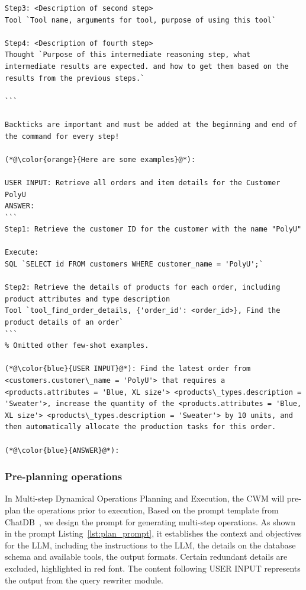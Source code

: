 \documentclass[preprint,12pt]{elsarticle}
\begin{document}
\begin{lstlisting}[style=prompt, label={lst:plan_prompt},caption={Prompt for generating the planned multi-step Operations},aboveskip=0pt, belowskip=0pt]
Step3: <Description of second step>
Tool `Tool name, arguments for tool, purpose of using this tool`

Step4: <Description of fourth step>
Thought `Purpose of this intermediate reasoning step, what intermediate results are expected. and how to get them based on the results from the previous steps.`

```

Backticks are important and must be added at the beginning and end of the command for every step!

(*@\color{orange}{Here are some examples}@*):

USER INPUT: Retrieve all orders and item details for the Customer PolyU
ANSWER:
```
Step1: Retrieve the customer ID for the customer with the name "PolyU"

Execute:
SQL `SELECT id FROM customers WHERE customer_name = 'PolyU';`

Step2: Retrieve the details of products for each order, including product attributes and type description
Tool `tool_find_order_details, {'order_id': <order_id>}, Find the product details of an order`
```
% Omitted other few-shot examples.

(*@\color{blue}{USER INPUT}@*): Find the latest order from <customers.customer\_name = 'PolyU'> that requires a <products.attributes = 'Blue, XL size'> <products\_types.description = 'Sweater'>, increase the quantity of the <products.attributes = 'Blue, XL size'> <products\_types.description = 'Sweater'> by 10 units, and then automatically allocate the production tasks for this order.

(*@\color{blue}{ANSWER}@*): 

\end{lstlisting}

\subsubsection{Pre-planning operations}
In Multi-step Dynamical Operations Planning and Execution, the CWM will pre-plan the operations prior to execution, 
Based on the prompt template from ChatDB~\cite{hu2023chatdb}, we design the prompt for generating multi-step  operations.
As shown in the prompt Listing~\ref{lst:plan_prompt}, it establishes the context and objectives for the LLM, including the instructions to the LLM, the details on the database schema and available tools, the output formats.
Certain redundant details are excluded, highlighted in red font.
The content following USER INPUT represents the output from the query rewriter module.
\end{document}
